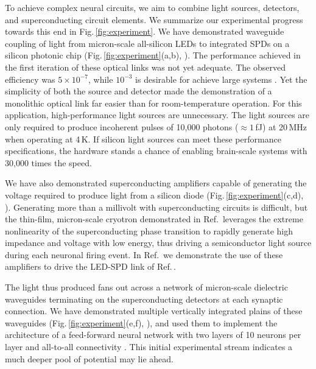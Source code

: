 \documentclass[twocolumn]{article}
\begin{document}
To achieve complex neural circuits, we aim to combine light sources, detectors, and superconducting circuit elements. We summarize our experimental progress towards this end in Fig.\,\ref{fig:experiment}. We have demonstrated waveguide coupling of light from micron-scale all-silicon LEDs to integrated SPDs on a silicon photonic chip (Fig.\,\ref{fig:experiment}(a,b), \cite{buch2017}). The performance achieved in the first iteration of these optical links was not yet adequate. The observed efficiency was $5\times10^{-7}$, while $10^{-3}$ is desirable for achieve large systems \cite{shICRC2018}. Yet the simplicity of both the source and detector made the demonstration of a monolithic optical link far easier than for room-temperature operation. For this application, high-performance light sources are unnecessary. The light sources are only required to produce incoherent pulses of 10,000 photons ($\approx 1$\,fJ) at 20\,MHz when operating at 4\,K. If silicon light sources can meet these performance specifications, the hardware stands a chance of enabling brain-scale systems with 30,000 times the speed.

We have also demonstrated superconducting amplifiers capable of generating the voltage required to produce light from a silicon diode (Fig.\,\ref{fig:experiment}(c,d), \cite{mc2019}). Generating more than a millivolt with superconducting circuits is difficult, but the thin-film, micron-scale cryotron demonstrated in Ref.\,\cite{mc2019} leverages the extreme nonlinearity of the superconducting phase transition to rapidly generate high impedance and voltage with low energy, thus driving a semiconductor light source during each neuronal firing event. In Ref.\,\cite{mc2019} we demonstrate the use of these amplifiers to drive the LED-SPD link of Ref.\,\cite{buch2017}.

The light thus produced fans out across a network of micron-scale dielectric waveguides terminating on the superconducting detectors at each synaptic connection. We have demonstrated multiple vertically integrated plains of these waveguides (Fig.\,\ref{fig:experiment}(e,f), \cite{chbu2017}), and used them to implement the architecture of a feed-forward neural network with two layers of 10 neurons per layer and all-to-all connectivity \cite{chbu2018}. This initial experimental stream indicates a much deeper pool of potential may lie ahead.  
\end{document}
